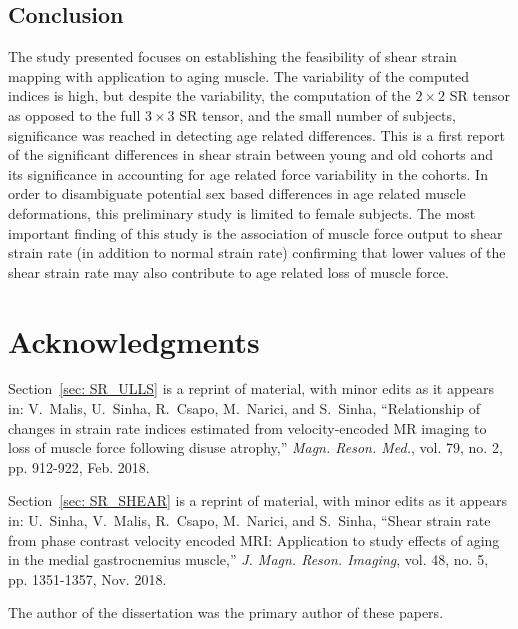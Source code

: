 \subsection{Conclusion}
The study presented focuses on establishing the feasibility of shear strain mapping with application to aging muscle. 
The variability of the computed indices is high, but despite the variability, the computation of the $2 \times 2$ SR tensor as opposed to the full $3 \times 3$ SR tensor, and the small number of subjects, significance was reached in detecting age related differences. 
This is a first report of the significant differences in shear strain between young and old cohorts and its significance in accounting for age related force variability in the cohorts. 
In order to disambiguate potential sex based differences in age related muscle deformations, this preliminary study is limited to female subjects.  
The most important finding of this study is the association of muscle force output to shear strain rate (in addition to normal strain rate) confirming that lower values of the shear strain rate may also contribute to age related loss of muscle force. 
\section{Acknowledgments}
Section~\ref{sec: SR_ULLS} is a reprint of material, with minor edits as it appears in: V.~Malis, U.~Sinha, R.~Csapo, M.~Narici, and S.~Sinha, ``Relationship of changes in strain rate indices estimated from velocity-encoded MR imaging to loss of muscle force following disuse atrophy,'' \emph{Magn. Reson. Med.}, vol. 79, no. 2, pp. 912-922, Feb. 2018.

Section~\ref{sec: SR_SHEAR} is a reprint of material, with minor edits as it appears in: U.~Sinha, V.~Malis, R.~Csapo, M.~Narici, and S.~Sinha, ``Shear strain rate from phase contrast velocity encoded MRI: Application to study effects of aging in the medial gastrocnemius muscle,'' \emph{J. Magn. Reson. Imaging}, vol. 48, no. 5, pp. 1351-1357, Nov. 2018.

The author of the dissertation was the primary author of these papers.
